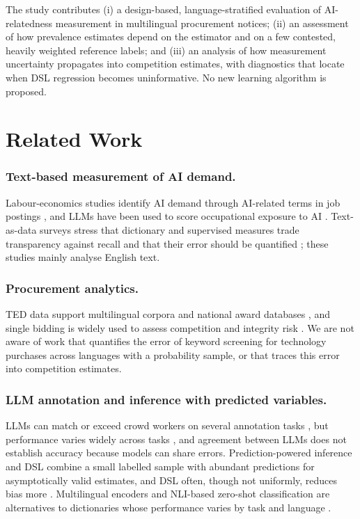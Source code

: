 \documentclass[runningheads]{llncs}
\begin{document}
The study contributes (i) a design-based, language-stratified evaluation of AI-relatedness measurement in multilingual procurement notices; (ii) an assessment of how prevalence estimates depend on the estimator and on a few contested, heavily weighted reference labels; and (iii) an analysis of how measurement uncertainty propagates into competition estimates, with diagnostics that locate when DSL regression becomes uninformative. No new learning algorithm is proposed.

\section{Related Work}
\subsubsection{Text-based measurement of AI demand.} Labour-economics studies identify AI demand through AI-related terms in job postings \cite{acemoglu2022,babina2024}, and LLMs have been used to score occupational exposure to AI \cite{eloundou2024}. Text-as-data surveys stress that dictionary and supervised measures trade transparency against recall and that their error should be quantified \cite{gentzkow2019}; these studies mainly analyse English text.

\subsubsection{Procurement analytics.} TED data support multilingual corpora \cite{ahmia2018} and national award databases \cite{potin2023}, and single bidding is widely used to assess competition and integrity risk \cite{fazekas2016,decarolis2022}. We are not aware of work that quantifies the error of keyword screening for technology purchases across languages with a probability sample, or that traces this error into competition estimates.

\subsubsection{LLM annotation and inference with predicted variables.} LLMs can match or exceed crowd workers on several annotation tasks \cite{gilardi2023}, but performance varies widely across tasks \cite{ziems2024}, and agreement between LLMs does not establish accuracy because models can share errors. Prediction-powered inference \cite{angelopoulos2023} and DSL \cite{egami2023} combine a small labelled sample with abundant predictions for asymptotically valid estimates, and DSL often, though not uniformly, reduces bias more \cite{audinet2025}. Multilingual encoders \cite{wang2024me5,reimers2020} and NLI-based zero-shot classification \cite{yin2019,he2023} are alternatives to dictionaries whose performance varies by task and language \cite{muennighoff2023}.
\end{document}
